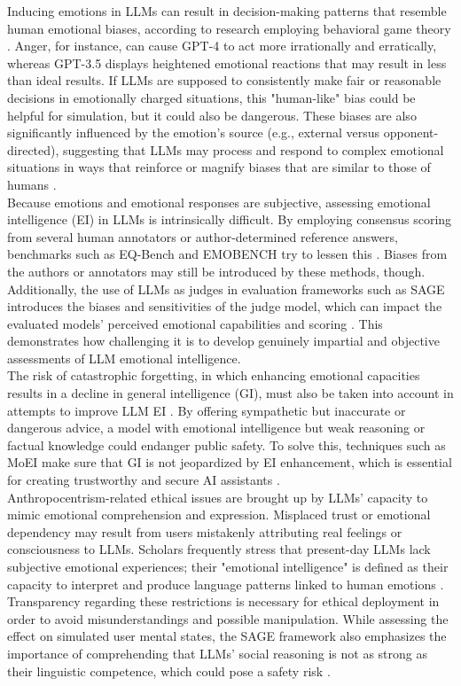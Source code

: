 \documentclass{DESSThesis}
\begin{document}
Inducing emotions in LLMs can result in decision-making patterns that resemble human emotional biases, according to research employing behavioral game theory \cite{mozikov_good_2024}. Anger, for instance, can cause GPT-4 to act more irrationally and erratically, whereas GPT-3.5 displays heightened emotional reactions that may result in less than ideal results. If LLMs are supposed to consistently make fair or reasonable decisions in emotionally charged situations, this "human-like" bias could be helpful for simulation, but it could also be dangerous. These biases are also significantly influenced by the emotion's source (e.g., external versus opponent-directed), suggesting that LLMs may process and respond to complex emotional situations in ways that reinforce or magnify biases that are similar to those of humans \cite{mozikov_good_2024}.
\\
Because emotions and emotional responses are subjective, assessing emotional intelligence (EI) in LLMs is intrinsically difficult. By employing consensus scoring from several human annotators or author-determined reference answers, benchmarks such as EQ-Bench and EMOBENCH try to lessen this \cite{paech_eq-bench_2024,sabour_emobench_2024}. Biases from the authors or annotators may still be introduced by these methods, though. Additionally, the use of LLMs as judges in evaluation frameworks such as SAGE introduces the biases and sensitivities of the judge model, which can impact the evaluated models' perceived emotional capabilities and scoring \cite{zhang_sentient_2025}. This demonstrates how challenging it is to develop genuinely impartial and objective assessments of LLM emotional intelligence.
\\
The risk of catastrophic forgetting, in which enhancing emotional capacities results in a decline in general intelligence (GI), must also be taken into account in attempts to improve LLM EI \cite{zhao_both_2024}. By offering sympathetic but inaccurate or dangerous advice, a model with emotional intelligence but weak reasoning or factual knowledge could endanger public safety. To solve this, techniques such as MoEI make sure that GI is not jeopardized by EI enhancement, which is essential for creating trustworthy and secure AI assistants \cite{zhao_both_2024}.
\\
Anthropocentrism-related ethical issues are brought up by LLMs' capacity to mimic emotional comprehension and expression. Misplaced trust or emotional dependency may result from users mistakenly attributing real feelings or consciousness to LLMs. Scholars frequently stress that present-day LLMs lack subjective emotional experiences; their "emotional intelligence" is defined as their capacity to interpret and produce language patterns linked to human emotions \cite{sabour_emobench_2024,zhao_both_2024,wang_emotional_2023}. Transparency regarding these restrictions is necessary for ethical deployment in order to avoid misunderstandings and possible manipulation. While assessing the effect on simulated user mental states, the SAGE framework also emphasizes the importance of comprehending that LLMs' social reasoning is not as strong as their linguistic competence, which could pose a safety risk \cite{zhang_sentient_2025}.
\end{document}
